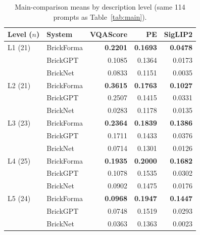 \documentclass[letterpaper]{article} %
\begin{document}
\begin{table}[!htbp]
\centering
\small
\setlength{\tabcolsep}{3pt}
\begin{tabular}{llrrr}
\toprule
Level ($n$) & System & VQAScore & PE & SigLIP2 \\
\midrule
L1 (21) & BrickForma & \textbf{0.2201} & \textbf{0.1693} & \textbf{0.0478} \\
 & BrickGPT & 0.1085 & 0.1364 & 0.0173 \\
 & BrickNet & 0.0833 & 0.1151 & 0.0035 \\
\midrule
L2 (21) & BrickForma & \textbf{0.3615} & \textbf{0.1763} & \textbf{0.1027} \\
 & BrickGPT & 0.2507 & 0.1415 & 0.0331 \\
 & BrickNet & 0.0283 & 0.1178 & 0.0135 \\
\midrule
L3 (23) & BrickForma & \textbf{0.2364} & \textbf{0.1839} & \textbf{0.1386} \\
 & BrickGPT & 0.1711 & 0.1433 & 0.0376 \\
 & BrickNet & 0.0714 & 0.1301 & 0.0126 \\
\midrule
L4 (25) & BrickForma & \textbf{0.1935} & \textbf{0.2000} & \textbf{0.1682} \\
 & BrickGPT & 0.1078 & 0.1535 & 0.0302 \\
 & BrickNet & 0.0902 & 0.1475 & 0.0176 \\
\midrule
L5 (24) & BrickForma & \textbf{0.0968} & \textbf{0.1947} & \textbf{0.1447} \\
 & BrickGPT & 0.0748 & 0.1519 & 0.0293 \\
 & BrickNet & 0.0363 & 0.1363 & 0.0023 \\
\bottomrule
\end{tabular}
\caption{Main-comparison means by description level (same 114 prompts as Table~\ref{tab:main}).}
\label{tab:levels}
\end{table}
\end{document}
